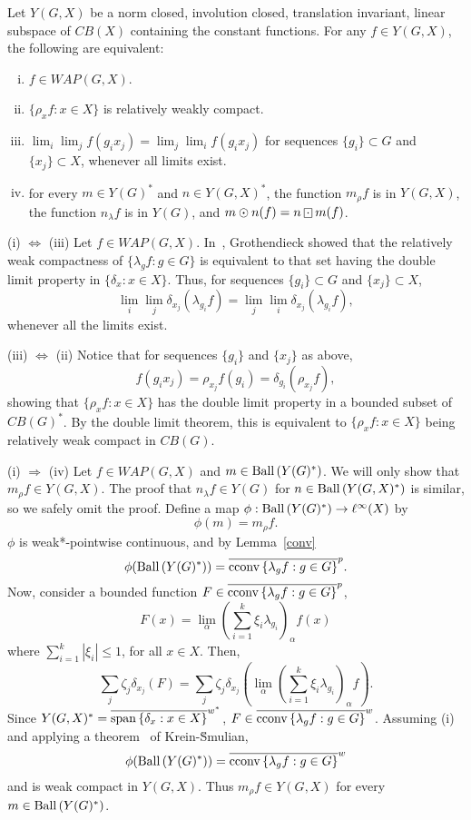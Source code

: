 \begin{theorem}
Let $Y(G,X)$ be a norm closed, involution closed, translation invariant, linear subspace of
$CB(X)$ containing the constant functions.  For any $f\in Y(G,X)$, the following are equivalent:
\begin{enumerate}[(i)]
\item $f\in WAP(G,X)$.
\item $\{\rho_x f : x\in X\}$ is relatively weakly compact.
\item $\lim_i \lim_j f(g_i x_j) = \lim_j \lim_i f(g_i x_j)$ for sequences $\{g_i\}\subset G$ and $\{x_j\}\subset X$,  whenever all limits exist.
\item for every $m\in Y(G)^*$ and $n\in Y(G,X)^*$, the function $m_\rho f$ is in $Y(G,X)$, the function $n_\lambda f$ is in $Y(G)$, and $m\odot n(f) = n\dotbox m(f)$.
\end{enumerate}
\end{theorem}
\proof
(i) $\Leftrightarrow$ (iii)  Let $f\in WAP(G,X)$.  In~\cite{groth}, Grothendieck showed that
the relatively weak compactness of $\{\lambda_g f: g\in G\}$
is equivalent to that set having the double limit property in $\{\delta_x : x\in X\}$.  Thus,
for sequences $\{g_i\}\subset G$ and $\{x_j\}\subset X$,
\[
\lim_i \lim_j \delta_{x_j} (\lambda_{g_i} f) = \lim_j \lim_i \delta_{x_j} (\lambda_{g_i} f),
\]
whenever all the limits exist.

(iii) $\Leftrightarrow$ (ii)  Notice that for sequences $\{g_i\}$ and $\{x_j\}$ as above,
\[
f(g_i x_j) = \rho_{x_j} f(g_i) = \delta_{g_i}(\rho_{x_j}f),
\]
showing that $\{\rho_x f: x\in X\}$ has the double limit property in a bounded subset of $CB(G)^*$.  By the double limit theorem,
this is equivalent to $\{\rho_x f: x\in X\}$ being relatively weak compact in $CB(G)$.

(i) $\Rightarrow$ (iv) Let $f\in WAP(G,X)$ and $m\in \operatorname{Ball\,}(Y(G)^*)$.  We will only show that $m_\rho f \in Y(G,X)$.
The proof that $n_\lambda f \in Y(G)$ for $n\in\operatorname{Ball\,}(Y(G,X)^*)$ is similar, so we safely omit the proof.
Define a map $\phi: \operatorname{Ball\,}(Y(G)^*) \rightarrow \ell^\infty(X)$ by
\[
\phi(m) = m_\rho f.
\]
$\phi$ is weak*-pointwise continuous, and by Lemma~\ref{conv}
\[
\phi(\operatorname{Ball\,}(Y(G)^*)) = \overline{\operatorname{cconv\,}\{\lambda_g f: g\in G\}}^p.
\]
Now, consider a bounded function $F\in \overline{\operatorname{cconv\,}\{\lambda_g f: g\in G\}}^p$,
\[
F(x) = \lim_\alpha \left(\sum_{i=1}^k \xi_i \lambda_{g_i} \right)_\alpha f(x)
\]
where $\sum_{i=1}^k | \xi_i | \leq 1$, for all $x\in X$.  Then,
\[
\sum_j\zeta_j\delta_{x_j}(F) = \sum_j\zeta_j\delta_{x_j}\left(\lim_\alpha\left(\sum_{i=1}^k \xi_i \lambda_{g_i} \right)_\alpha f \right).
\]
Since $Y(G,X)^* = \overline{\operatorname{span\,}\{\delta_x : x\in X\}}^{w^*}$, $F\in \overline{\operatorname{cconv\,}\{\lambda_g f: g\in G\}}^w$.
Assuming (i) and applying a theorem~\cite[V.6.4]{d&s} of Krein-\u{S}mulian,
\[
\phi(\operatorname{Ball\,}(Y(G)^*)) = \overline{\operatorname{cconv\,}\{\lambda_g f: g\in G\}}^w
\]
and is weak compact in $Y(G,X)$.  Thus $m_\rho f \in Y(G,X)$ for every $m\in \operatorname{Ball\,}(Y(G)^*)$.

